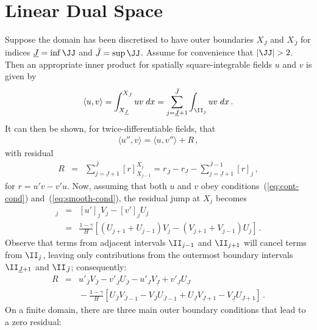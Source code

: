 \documentclass[12pt,a5paper]{article}
\begin{document}
\section{Linear Dual Space}
Suppose the domain \XX has been discretised to have outer boundaries $X_{\underline{J}}$ and $X_{\bar{J}}$ for indices
$\underline{J}=\inf{\JJ}$ and $\bar{J}=\sup{\JJ}$. Assume for convenience that $|\JJ|> 2$.
Then an appropriate inner product for spatially square-integrable fields $u$ and $v$ is given by
\begin{eqnarray}
\langle u,v\rangle = \int_{X_{\underline{J}}}^{X_{\bar{J}}}uv\;dx
= \sum_{j=\underline{J}+1}^{\bar{J}}\int_{\II_j}uv\;dx\,.
\end{eqnarray}
It can then be shown, for twice-differentiable fields, that
\begin{eqnarray}
\langle u'',v\rangle =
\langle u,v''\rangle + R\,,
\end{eqnarray}
with residual 
\begin{eqnarray}
R &= & \sum_{j=\underline{J}+1}^{\bar{J}}[r]_{X_{j-1}}^{X_j}
= r_{\bar{J}}-r_{\underline{J}}-\sum_{j=\underline{J}+1}^{\bar{J}-1}[r]_j\,,
\end{eqnarray}
for $r=u'v-v'u$.
Now, assuming that both $u$ and $v$ obey conditions~(\ref{eq:cont-cond}) and~(\ref{eq:smooth-cond}), 
the residual jump at $X_j$ becomes
\begin{eqnarray}
[r]_j & = & [u']_j V_j-[v']_j U_j
\nonumber\\
& = & \frac{1-\gamma}{H}\left[
(U_{j+1}+U_{j-1})V_j-(V_{j+1}+V_{j-1})U_j
\right]\,.
\end{eqnarray}
Observe that terms from adjacent intervals $\II_{j-1}$ and $\II_{j+1}$ will cancel terms from $\II_j$, leaving
only contributions from the outermost boundary intervals $\II_{\underline{J}+1}$ and $\II_{\bar{J}}$; consequently:
\begin{eqnarray}
R & = & 
u'_{\bar{J}}V_{\bar{J}}-v'_{\bar{J}}U_{\bar{J}}
-u'_{\underline{J}}V_{\underline{J}}+v'_{\underline{J}}U_{\underline{J}}
\nonumber\\ &&
{}-\frac{1-\gamma}{H}\left[
U_{\bar{J}}V_{\bar{J}-1}-V_{\bar{J}}U_{\bar{J}-1}
+U_{\underline{J}}V_{\underline{J}+1}-V_{\underline{J}}U_{\underline{J}+1}
\right]\,.
\end{eqnarray}
On a finite domain, there are three main outer boundary conditions that lead to a zero residual:
\end{document}
